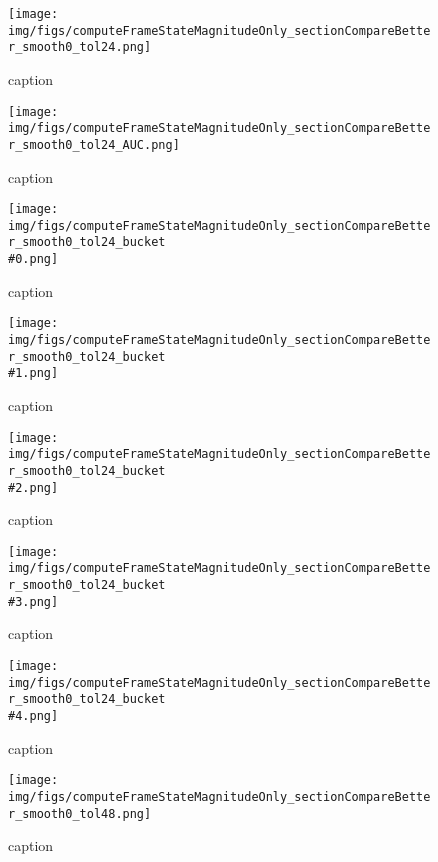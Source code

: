 %
\begin{figure}[!ht]
	\centering
	\texttt{[image: img/figs/computeFrameStateMagnitudeOnly\_sectionCompareBetter\_smooth0\_tol24.png]}
	\caption{caption}
	\label{fig:computeFrameStateMagnitudeOnly_sectionCompareBetter_smooth0_tol24.png}
\end{figure}
%
\begin{figure}[!ht]
	\centering
	\texttt{[image: img/figs/computeFrameStateMagnitudeOnly\_sectionCompareBetter\_smooth0\_tol24\_AUC.png]}
	\caption{caption}
	\label{fig:computeFrameStateMagnitudeOnly_sectionCompareBetter_smooth0_tol24_AUC.png}
\end{figure}
%
\begin{figure}[!ht]
	\centering
	\texttt{[image: img/figs/computeFrameStateMagnitudeOnly\_sectionCompareBetter\_smooth0\_tol24\_bucket\\\#0.png]}
	\caption{caption}
	\label{fig:computeFrameStateMagnitudeOnly_sectionCompareBetter_smooth0_tol24_bucket\#0.png}
\end{figure}
%
\begin{figure}[!ht]
	\centering
	\texttt{[image: img/figs/computeFrameStateMagnitudeOnly\_sectionCompareBetter\_smooth0\_tol24\_bucket\\\#1.png]}
	\caption{caption}
	\label{fig:computeFrameStateMagnitudeOnly_sectionCompareBetter_smooth0_tol24_bucket\#1.png}
\end{figure}
%
\begin{figure}[!ht]
	\centering
	\texttt{[image: img/figs/computeFrameStateMagnitudeOnly\_sectionCompareBetter\_smooth0\_tol24\_bucket\\\#2.png]}
	\caption{caption}
	\label{fig:computeFrameStateMagnitudeOnly_sectionCompareBetter_smooth0_tol24_bucket\#2.png}
\end{figure}
%
\begin{figure}[!ht]
	\centering
	\texttt{[image: img/figs/computeFrameStateMagnitudeOnly\_sectionCompareBetter\_smooth0\_tol24\_bucket\\\#3.png]}
	\caption{caption}
	\label{fig:computeFrameStateMagnitudeOnly_sectionCompareBetter_smooth0_tol24_bucket\#3.png}
\end{figure}
%
\begin{figure}[!ht]
	\centering
	\texttt{[image: img/figs/computeFrameStateMagnitudeOnly\_sectionCompareBetter\_smooth0\_tol24\_bucket\\\#4.png]}
	\caption{caption}
	\label{fig:computeFrameStateMagnitudeOnly_sectionCompareBetter_smooth0_tol24_bucket\#4.png}
\end{figure}
%
\begin{figure}[!ht]
	\centering
	\texttt{[image: img/figs/computeFrameStateMagnitudeOnly\_sectionCompareBetter\_smooth0\_tol48.png]}
	\caption{caption}
	\label{fig:computeFrameStateMagnitudeOnly_sectionCompareBetter_smooth0_tol48.png}
\end{figure}
